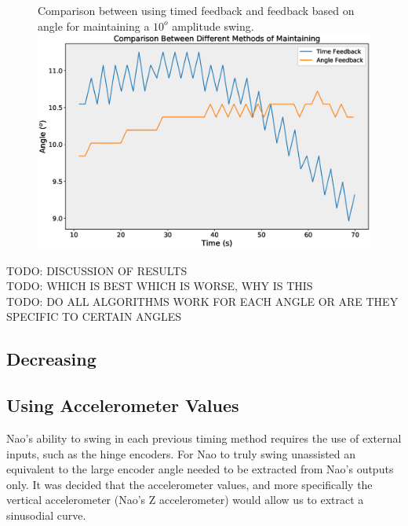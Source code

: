 \documentclass[11pt]{article}
\newcommand*\ruleline[1]{\par\noindent\raisebox{.8ex}{\makebox[\linewidth]{\hrulefill\hspace{1ex}\raisebox{-.8ex}{#1}\hspace{1ex}\hrulefill}}}
\begin{document}
    \begin{figure}[!htb]
        \centering
        \captionbox
             {Comparison between using timed feedback and feedback based on angle for maintaining a $10^o$ amplitude swing.\label{fig:MaintainFeedbackComparison}}
             {\includegraphics[width=1.0\textwidth]{MaintainFeedback.eps}}
    \end{figure}
    
TODO: DISCUSSION OF RESULTS\\
TODO: WHICH IS BEST WHICH IS WORSE, WHY IS THIS\\
TODO: DO ALL ALGORITHMS WORK FOR EACH ANGLE OR ARE THEY SPECIFIC TO CERTAIN ANGLES\\

\clearpage

\subsection{Decreasing}

\subsection{Using Accelerometer Values}
\ruleline{George Sheppard}
Nao's ability to swing in each previous timing method requires the use of external inputs, such as the hinge encoders. For Nao to truly swing unassisted an equivalent to the large encoder angle needed to be extracted from Nao's outputs only. It was decided that the accelerometer values, and more specifically the vertical accelerometer (Nao's Z accelerometer) would allow us to extract a sinusodial curve.\\
\end{document}
